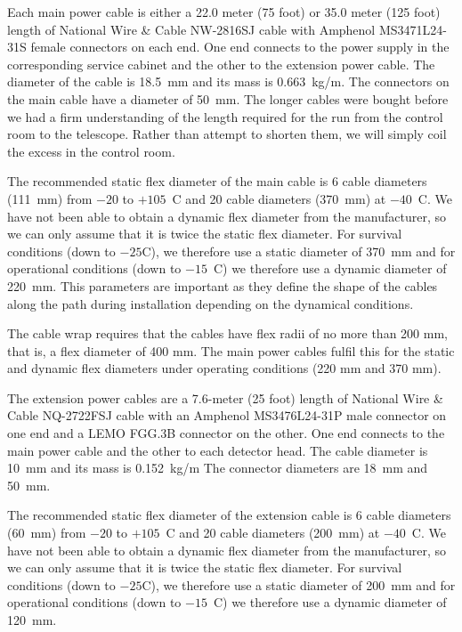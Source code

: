 \documentclass{article}
\begin{document}
Each main power cable is either a 22.0 meter (75 foot) or 35.0 meter (125 foot) length of National Wire \& Cable NW-2816SJ cable with Amphenol MS3471L24-31S female connectors on each end. One end connects to the power supply in the corresponding service cabinet and the other to the extension power cable. The diameter of the cable is 18.5~mm and its mass is 0.663~kg/m. The connectors on the main cable have a diameter of 50~mm. The longer cables were bought before we had a firm understanding of the length required for the run from the control room to the telescope. Rather than attempt to shorten them, we will simply coil the excess in the control room.

The recommended static flex diameter of the main cable is 6 cable diameters (111~mm) from $-20$ to $+105$~C and 20 cable diameters (370~mm) at $-40$~C. We have not been able to obtain a dynamic flex diameter from the manufacturer, so we can only assume that it is twice the static flex diameter. For survival conditions (down to $-25$C), we therefore use a static diameter of 370~mm and for operational conditions (down to $-15$~C) we therefore use a dynamic diameter of 220~mm. This parameters are important as they define the shape of the cables along the path during installation depending on the dynamical conditions.

The cable wrap requires that the cables have flex radii of no more than 200 mm, that is, a flex diameter of 400 mm. The main power cables fulfil this for the static and dynamic flex diameters under operating conditions (220 mm and 370 mm).

The extension power cables are a 7.6-meter (25 foot) length of National Wire \& Cable  NQ-2722FSJ cable with an Amphenol MS3476L24-31P male connector on one end and a LEMO FGG.3B connector on the other. One end connects to the main power cable and the other to each detector head. The cable diameter is 10~mm and its mass is 0.152~kg/m The connector diameters are 18~mm and 50~mm. 

The recommended static flex diameter of the extension cable is 6 cable diameters (60~mm) from $-20$ to $+105$~C and 20 cable diameters (200~mm) at $-40$~C. We have not been able to obtain a dynamic flex diameter from the manufacturer, so we can only assume that it is twice the static flex diameter. For survival conditions (down to $-25$C), we therefore use a static diameter of 200~mm and for operational conditions (down to $-15$~C) we therefore use a dynamic diameter of 120~mm.

\end{document}
